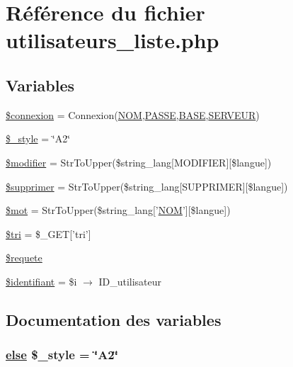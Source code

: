 \hypertarget{utilisateurs__liste_8php}{
\section{R\'{e}f\'{e}rence du fichier utilisateurs\_\-liste.php}
\label{utilisateurs__liste_8php}
}
\subsection*{Variables}
\begin{CompactItemize}
\item 
\hyperlink{utilisateurs__liste_8php_a0}{\$connexion} = Connexion(\hyperlink{pma__connect_8php_a0}{NOM},\hyperlink{pma__connect_8php_a1}{PASSE},\hyperlink{pma__connect_8php_a3}{BASE},\hyperlink{pma__connect_8php_a2}{SERVEUR})
\item 
\hyperlink{utilisateurs__liste_8php_a1}{\$\_\-style} = \char`\"{}A2\char`\"{}
\item 
\hyperlink{utilisateurs__liste_8php_a2}{\$modifier} = Str\-To\-Upper(\$string\_\-lang\mbox{[}MODIFIER\mbox{]}\mbox{[}\$langue\mbox{]})
\item 
\hyperlink{utilisateurs__liste_8php_a3}{\$supprimer} = Str\-To\-Upper(\$string\_\-lang\mbox{[}SUPPRIMER\mbox{]}\mbox{[}\$langue\mbox{]})
\item 
\hyperlink{utilisateurs__liste_8php_a4}{\$mot} = Str\-To\-Upper(\$string\_\-lang\mbox{[}'\hyperlink{pma__connect_8php_a0}{NOM}'\mbox{]}\mbox{[}\$langue\mbox{]})
\item 
\hyperlink{utilisateurs__liste_8php_a5}{\$tri} = \$\_\-GET\mbox{[}'tri'\mbox{]}
\item 
\hyperlink{utilisateurs__liste_8php_a6}{\$requete}
\item 
\hyperlink{utilisateurs__liste_8php_a7}{\$identifiant} = \$i $\rightarrow$ ID\_\-utilisateur
\end{CompactItemize}


\subsection{Documentation des variables}
\hypertarget{utilisateurs__liste_8php_a1}{
\subsubsection[\$\_\-style]{\setlength{\rightskip}{0pt plus 5cm}\hyperlink{cron_8php_a9}{else} \$\_\-style = \char`\"{}A2\char`\"{}}}
\label{utilisateurs__liste_8php_a1}


